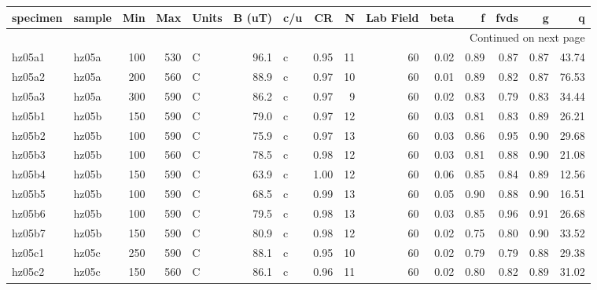 \documentclass{article}
\begin{document}
\begin{landscape}
\begin{longtable}{llrrlrlrrrrrrrr}
\toprule
    specimen &     sample &  Min &  Max & Units &  B (uT) & c/u &    CR &   N &  Lab Field &  beta &     f &  fvds &     g &       q \\
\midrule
\endhead
\midrule
\multicolumn{15}{r}{{Continued on next page}} \\
\midrule
\endfoot

\bottomrule
\endlastfoot
      hz05a1 &      hz05a &  100 &  530 &     C &    96.1 &   c &  0.95 &  11 &         60 &  0.02 &  0.89 &  0.87 &  0.87 &   43.74 \\
      hz05a2 &      hz05a &  200 &  560 &     C &    88.9 &   c &  0.97 &  10 &         60 &  0.01 &  0.89 &  0.82 &  0.87 &   76.53 \\
      hz05a3 &      hz05a &  300 &  590 &     C &    86.2 &   c &  0.97 &   9 &         60 &  0.02 &  0.83 &  0.79 &  0.83 &   34.44 \\
      hz05b1 &      hz05b &  150 &  590 &     C &    79.0 &   c &  0.97 &  12 &         60 &  0.03 &  0.81 &  0.83 &  0.89 &   26.21 \\
      hz05b2 &      hz05b &  100 &  590 &     C &    75.9 &   c &  0.97 &  13 &         60 &  0.03 &  0.86 &  0.95 &  0.90 &   29.68 \\
      hz05b3 &      hz05b &  100 &  560 &     C &    78.5 &   c &  0.98 &  12 &         60 &  0.03 &  0.81 &  0.88 &  0.90 &   21.08 \\
      hz05b4 &      hz05b &  150 &  590 &     C &    63.9 &   c &  1.00 &  12 &         60 &  0.06 &  0.85 &  0.84 &  0.89 &   12.56 \\
      hz05b5 &      hz05b &  100 &  590 &     C &    68.5 &   c &  0.99 &  13 &         60 &  0.05 &  0.90 &  0.88 &  0.90 &   16.51 \\
      hz05b6 &      hz05b &  100 &  590 &     C &    79.5 &   c &  0.98 &  13 &         60 &  0.03 &  0.85 &  0.96 &  0.91 &   26.68 \\
      hz05b7 &      hz05b &  150 &  590 &     C &    80.9 &   c &  0.98 &  12 &         60 &  0.02 &  0.75 &  0.80 &  0.90 &   33.52 \\
      hz05c1 &      hz05c &  250 &  590 &     C &    88.1 &   c &  0.95 &  10 &         60 &  0.02 &  0.79 &  0.79 &  0.88 &   29.38 \\
      hz05c2 &      hz05c &  150 &  560 &     C &    86.1 &   c &  0.96 &  11 &         60 &  0.02 &  0.80 &  0.82 &  0.89 &   31.02 \\

\end{longtable}
\end{landscape}
\end{document}
